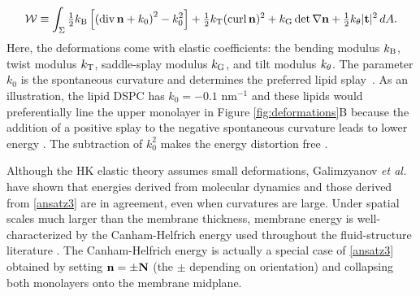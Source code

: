 \begin{equation}
\label{ansatz3}
{\cal W} \equiv \int_{\Sigma} 
  \tfrac{1}{2}k_{\mathrm{B}}\left[ \left( \operatorname{div} {\bf n} + k_0\right)^2 - k_0^2\right] 
+ \tfrac{1}{2}k_{\mathrm{T}} (\operatorname{curl} {\bf n})^2 + k_{\mathrm{G}}  \det \nabla {\bf n} + \tfrac{1}{2}k_{\theta} |{\bf t}|^2 \,dA.
\end{equation}
Here, 
the deformations come with elastic coefficients: the bending modulus
$k_{\mathrm{B}}$, twist modulus $k_{\mathrm{T}}$, saddle-splay modulus $k_{\mathrm{G}}$, and tilt modulus
$k_{\theta}$.
%
The parameter $k_0$ is the spontaneous curvature and determines the
preferred lipid splay~\cite{RoLi15,Kozlov2007}.  As an illustration, the
lipid DSPC has $k_0 = -0.1$ nm$^{-1}$ 
and these lipids would preferentially line the upper monolayer in Figure \ref{fig:deformations}B  
because the addition of a positive splay 
to the negative spontaneous curvature leads to lower energy \cite{Kamal22245, C3SM51829A, RoLi15,FriedSeguin15}.
The subtraction of $k_0^2$ makes the energy distortion free
\cite{Helfrich73,PhysRevLett.113.248102,Hamm2000}.

Although the HK elastic theory assumes small deformations, 
Galimzyanov {\em et al.}~\cite{C9SM02079A} have shown that energies derived from
molecular dynamics and those derived from \eqref{ansatz3} are in agreement, even when curvatures are large.
Under spatial scales much larger than the
membrane thickness, membrane energy is well-characterized by the
Canham-Helfrich energy used throughout the fluid-structure literature
\cite{QiangDu09, Lowengrub07,KimLai2010_JCP, Hu, HuLaiSeolEtAl2016_JCP,
  qua-bir2014, qua-vee-you2019}.
The Canham-Helfrich energy is actually a special case of
\eqref{ansatz3} obtained by setting ${\bf n} =  \pm {\bf N}$ (the $\pm$ depending on
orientation) and collapsing both monolayers onto the membrane midplane.

